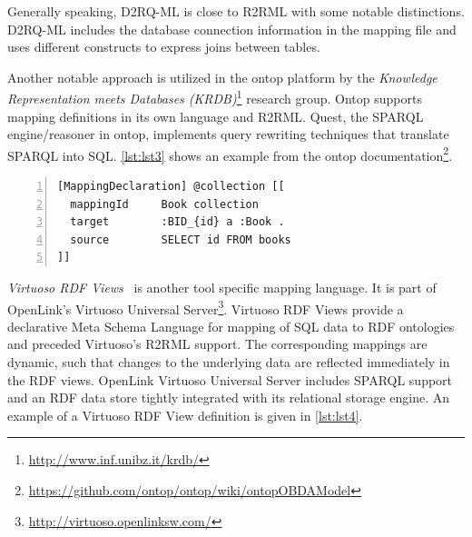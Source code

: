  Generally speaking, D2RQ-ML is close to R2RML with some notable distinctions.
D2RQ-ML includes the database connection information in the mapping file and uses different constructs to express joins between tables.

Another notable approach is utilized in the ontop\cite{ontop} platform by the
\emph{Knowledge Representation meets Databases (KRDB)}\footnote{\url{http://www.inf.unibz.it/krdb/}} research group.
Ontop supports mapping definitions in its own language and R2RML.
Quest, the SPARQL engine/reasoner in ontop, implements query rewriting techniques that translate SPARQL into SQL.
\autoref{lst:lst3} shows an example from the ontop
documentation\footnote{\url{https://github.com/ontop/ontop/wiki/ontopOBDAModel}}.


\begin{lstlisting}[label=lst:lst3, style=sparql,numbers=left, numberstyle=\tiny, caption = Example of the Ontop mapping language]
[MappingDeclaration] @collection [[
  mappingId     Book collection
  target        :BID_{id} a :Book .
  source        SELECT id FROM books
]]
\end{lstlisting}

\emph{Virtuoso RDF Views}~\cite{virtuosoRdfViews} is another tool specific mapping language.
It is part of OpenLink's Virtuoso Universal Server\footnote{\url{http://virtuoso.openlinksw.com/}}.
Virtuoso RDF Views provide a declarative Meta Schema Language for mapping of SQL data to RDF ontologies and preceded Virtuoso's R2RML support.
The corresponding mappings are dynamic, such that changes to the underlying data are reflected immediately in the RDF views.
OpenLink Virtuoso Universal Server includes SPARQL support and an RDF data store tightly integrated with its relational storage engine.
An example of a Virtuoso RDF View definition is given in \autoref{lst:lst4}.

